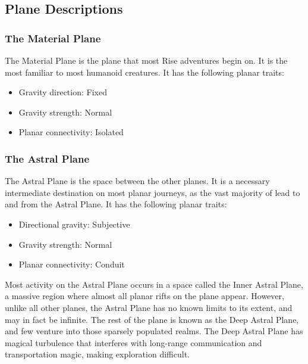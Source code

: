 
    \subsection{Plane Descriptions}
        \subsubsection{The Material Plane}
            The Material Plane is the plane that most Rise adventures begin on.
            It is the most familiar to most humanoid creatures.
            It has the following planar traits:
            \begin{itemize}
                \item Gravity direction: Fixed
                \item Gravity strength: Normal
                \item Planar connectivity: Isolated
            \end{itemize}

        \subsubsection{The Astral Plane}\label{The Astral Plane}
            The Astral Plane is the space between the other planes.
            It is a necessary intermediate destination on most planar journeys, as the vast majority of  lead to and from the Astral Plane.
            It has the following planar traits:
            \begin{itemize}
                \item Directional gravity: Subjective
                \item Gravity strength: Normal
                \item Planar connectivity: Conduit
            \end{itemize}

            Most activity on the Astral Plane occurs in a space called the Inner Astral Plane, a massive region where almost all planar rifts on the plane appear.
            However, unlike all other planes, the Astral Plane has no known limits to its extent, and may in fact be infinite.
            The rest of the plane is known as the Deep Astral Plane, and few venture into those sparsely populated realms.
            The Deep Astral Plane has magical turbulence that interferes with long-range communication and transportation magic, making exploration difficult.
